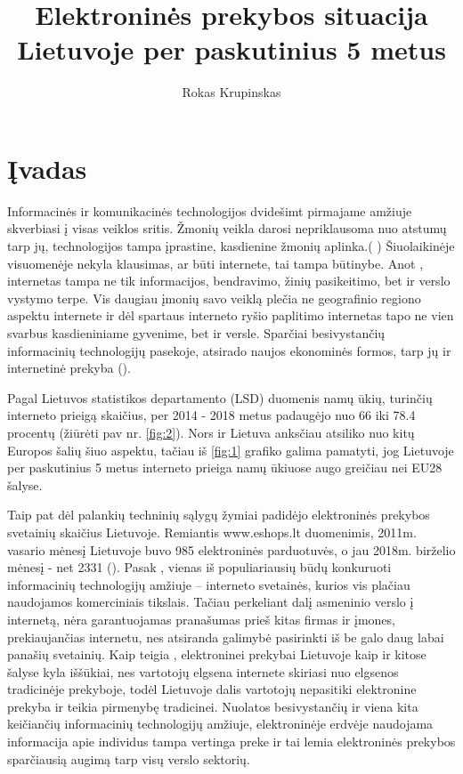 \documentclass[12pt, titlepage]{article}
\title{Elektroninės prekybos situacija Lietuvoje per paskutinius 5 metus}
\author{Rokas Krupinskas}
\begin{document}
\maketitle
\tableofcontents
\newpage

\section{Įvadas}
\smallskip
\par
\hspace{\parindent}
Informacinės ir komunikacinės technologijos dvidešimt pirmajame amžiuje skverbiasi į visas veiklos sritis. Žmonių veikla darosi nepriklausoma nuo atstumų tarp jų, technologijos tampa įprastine, kasdienine žmonių aplinka.( \textcite{davidavivciene2011elektronines}) Šiuolaikinėje visuomenėje nekyla klausimas, ar būti internete, tai tampa būtinybe. Anot \cite{benesevivciene2014veiksniku}, internetas tampa ne tik informacijos, bendravimo, žinių pasikeitimo, bet ir verslo vystymo terpe. Vis daugiau įmonių savo veiklą plečia ne geografinio regiono aspektu internete ir dėl spartaus interneto ryšio paplitimo internetas tapo ne vien svarbus kasdieniniame gyvenime, bet ir versle. Sparčiai besivystančių informacinių technologijų pasekoje, atsirado naujos ekonominės formos, tarp jų ir internetinė prekyba (\textcite{dambrauskaite2014elektronines}).
\par
Pagal Lietuvos statistikos departamento (LSD) duomenis namų ūkių, turinčių interneto prieigą skaičius, per 2014 - 2018 metus padaugėjo nuo 66 iki 78.4 procentų (žiūrėti pav nr. \ref{fig:2}). Nors ir Lietuva anksčiau atsiliko nuo kitų Europos šalių šiuo aspektu, tačiau iš \ref{fig:1} grafiko galima pamatyti, jog Lietuvoje per paskutinius 5 metus interneto prieiga namų ūkiuose augo greičiau nei EU28 šalyse.
\par
Taip pat dėl palankių techninių sąlygų žymiai padidėjo elektroninės prekybos svetainių skaičius Lietuvoje. Remiantis www.eshops.lt duomenimis, 2011m. vasario mėnesį Lietuvoje buvo 985 elektroninės parduotuvės, o jau 2018m. birželio mėnesį -  net 2331 (\textcite{vsivickas2011elektronine}). Pasak \textcite{davidavivciene2011elektronines}, vienas iš populiariausių būdų konkuruoti informacinių technologijų amžiuje – interneto svetainės, kurios vis plačiau naudojamos komerciniais tikslais. Tačiau perkeliant dalį asmeninio verslo į internetą, nėra garantuojamas pranašumas prieš kitas firmas ir įmones, prekiaujančias internetu, nes atsiranda galimybė pasirinkti iš be galo daug labai panašių svetainių. Kaip teigia \cite{pabedinskaite2012vartotojku}, elektroninei prekybai Lietuvoje kaip ir kitose šalyse kyla iššūkiai, nes vartotojų elgsena internete skiriasi nuo elgsenos tradicinėje prekyboje, todėl Lietuvoje dalis vartotojų nepasitiki elektronine prekyba ir teikia pirmenybę tradicinei. Nuolatos besivystančių ir viena kita keičiančių informacinių technologijų amžiuje, elektroninėje erdvėje naudojama informacija apie individus tampa vertinga preke ir tai lemia elektroninės prekybos sparčiausią augimą tarp visų verslo sektorių.
\end{document}
